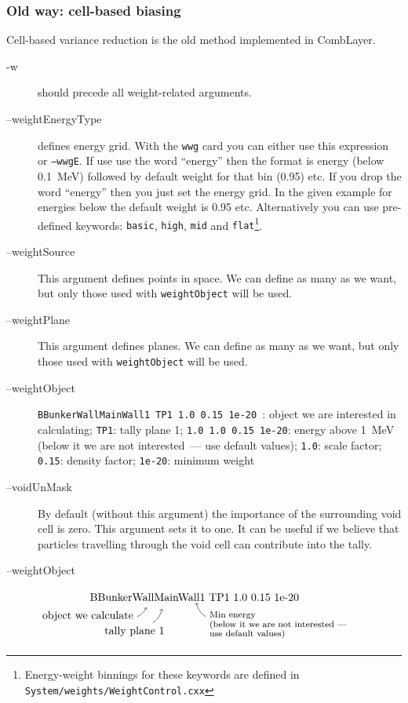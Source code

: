 \subsubsection{Old way: cell-based biasing}
\label{sec:vr:cadis:cell}
Cell-based variance reduction is the old method implemented in CombLayer.



\begin{description}
\item[-w] should precede all weight-related arguments. 
\item[--weightEnergyType] defines energy grid. With the {\tt wwg} card you can either use this expression or {\tt --wwgE}.
  If use use the word ``energy'' then the format is energy (below \SI{0.1}{\mega\electronvolt}) followed by default weight for that bin (0.95) etc.
  If you drop the word ``energy'' then you just set the energy grid.
  In the given example for energies below  the default weight is 0.95 etc.
  Alternatively you can use pre-defined keywords:
  {\tt basic}, {\tt high}, {\tt mid} and {\tt flat}\footnote{Energy-weight binnings for these keywords are defined in \tt{System/weights/WeightControl.cxx}}.
\item[--weightSource] This argument defines points in space. We can define as many as we want, but only those used with {\tt weightObject} will be used.
\item[--weightPlane] This argument defines planes. We can define as many as we want, but only those used with {\tt weightObject} will be used.
\item[--weightObject] {\tt BBunkerWallMainWall1 TP1 1.0 0.15 1e-20 }: object we are interested in calculating; {\tt TP1}: tally plane 1;
  \mbox{\tt 1.0 1.0 0.15 1e-20}: energy above \SI{1}{\mega\electronvolt} (below it we are not interested~--- use default values);
  {\tt 1.0}: scale factor; 
  {\tt 0.15}: density factor; {\tt 1e-20}: minimum weight %
\item[--voidUnMask] By default (without this argument) the importance of the surrounding void cell is zero. This argument sets it to one.
  It can be useful if we believe that particles travelling through the void cell can contribute into the tally.

\item[--weightObject] 
$\underset{
  \begin{tikzpicture}
    \node[below left] at (-1,0) {object we calculate};  \draw[->](-1.0, -0.3) to[bend right=20] ++(0.3,2ex);
    \node[below left] at (0,-0.5) {tally plane 1};      \draw[->](-0.5, -0.5) to[bend right=20] ++(0.3,3ex);
    \node[below right] at (1.2,0.0) {\footnotesize{Min energy}};      \draw[->](1.2, -0.3) to[bend left=20] ++(-0.3,3ex);
    \node[below right] at (1.2,-0.3) {\footnotesize{(below it we are not interested~---}};
    \node[below right] at (1.2,-0.6) {\footnotesize{use default values)}};
  \end{tikzpicture}
}{\text{BBunkerWallMainWall1 TP1 1.0 0.15 1e-20}}$


\end{description}
